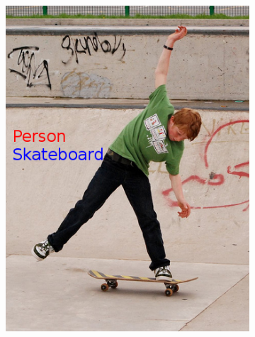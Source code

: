 \begin{figure}[H]
    \centering
    \begin{subfigure}[b]{0.2\textwidth}
        \center
        \includegraphics[width=\textwidth]{Figs/Problem/objfieldscat.png}
        \caption{}\label{fig:objcat}
    \end{subfigure}
    \begin{subfigure}[b]{0.2\textwidth}
        \center

\end{subfigure}
\end{figure}
